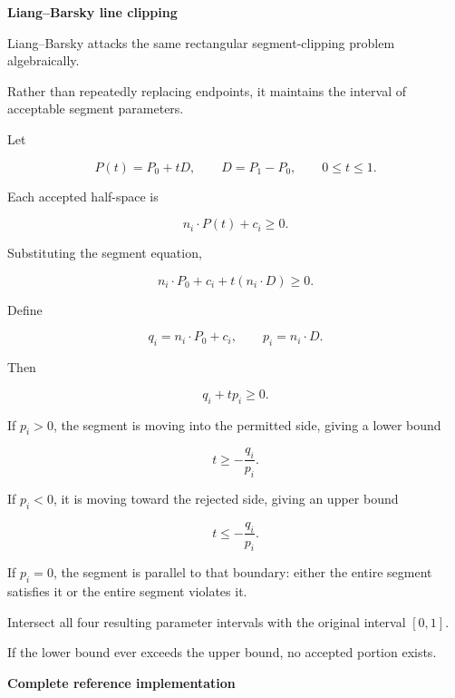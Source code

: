 \textbf{Liang--Barsky line clipping}

Liang--Barsky attacks the same rectangular segment-clipping problem algebraically.

Rather than repeatedly replacing endpoints, it maintains the interval of acceptable segment parameters.

Let

\[
P(t)=P_0+tD,\qquad D=P_1-P_0,\qquad 0\le t\le1.
\]

Each accepted half-space is

\[
n_i\cdot P(t)+c_i\ge0.
\]

Substituting the segment equation,

\[
n_i\cdot P_0+c_i+t(n_i\cdot D)\ge0.
\]

Define

\[
q_i=n_i\cdot P_0+c_i,\qquad p_i=n_i\cdot D.
\]

Then

\[
q_i+t p_i\ge0.
\]

If \(p_i>0\), the segment is moving into the permitted side, giving a lower bound

\[
t\ge-\frac{q_i}{p_i}.
\]

If \(p_i<0\), it is moving toward the rejected side, giving an upper bound

\[
t\le-\frac{q_i}{p_i}.
\]

If \(p_i=0\), the segment is parallel to that boundary: either the entire segment satisfies it or the entire segment violates it.

Intersect all four resulting parameter intervals with the original interval \([0,1]\).

If the lower bound ever exceeds the upper bound, no accepted portion exists.

\textbf{Complete reference implementation}

